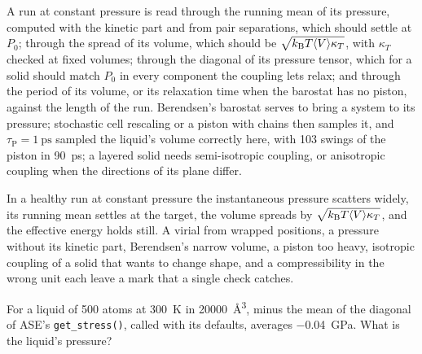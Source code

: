 \begin{practice}
A run at constant pressure is read through the running mean of its
pressure, computed with the kinetic part and from pair separations, which
should settle at $P_0$; through the spread of its volume, which should be
$\sqrt{k_{\mathrm{B}} T\langle V \rangle\kappa_T}$, with $\kappa_T$ checked at fixed volumes;
through the diagonal of its pressure tensor, which for a solid should
match $P_0$ in every component the coupling lets relax; and through the
period of its volume, or its relaxation time when the barostat has no
piston, against the length of the run. Berendsen's barostat serves to
bring a system to its pressure; stochastic cell rescaling or a piston
with chains then samples it, and $\tau_{\mathrm P} = \SI{1}{\pico\second}$
sampled the liquid's volume correctly here, with 103 swings of the piston
in \SI{90}{\pico\second}; a layered solid needs semi-isotropic coupling, or
anisotropic coupling when the directions of its plane differ.
\end{practice}

\begin{keyidea}
In a healthy run at constant pressure the instantaneous pressure
scatters widely, its running mean settles at the target, the volume
spreads by $\sqrt{k_{\mathrm{B}} T\langle V \rangle\kappa_T}$, and the effective energy holds
still. A virial from wrapped positions, a pressure without its kinetic
part, Berendsen's narrow volume, a piston too heavy, isotropic coupling of
a solid that wants to change shape, and a compressibility in the wrong
unit each leave a mark that a single check catches.
\end{keyidea}


\begin{selfcheck}
For a liquid of 500 atoms at \SI{300}{\kelvin} in
\SI{20000}{\angstrom\cubed}, minus the mean of the diagonal of ASE's
\texttt{get\_stress()}, called with its defaults, averages
\SI{-0.04}{\giga\pascal}. What is the liquid's pressure?
\end{selfcheck}
